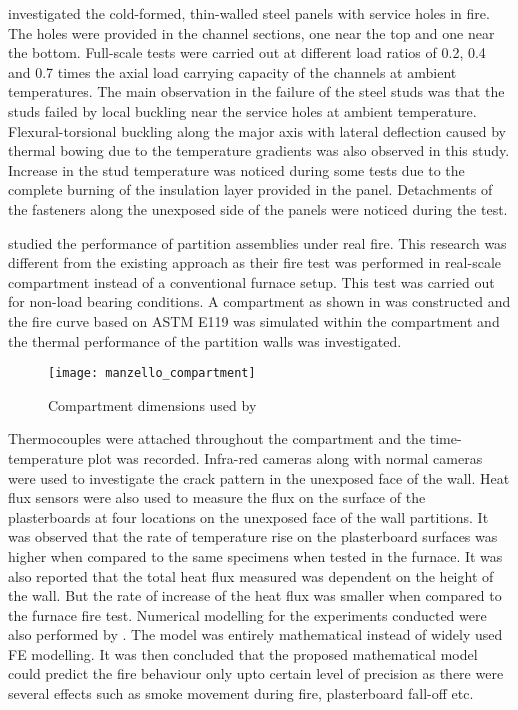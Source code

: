 \citet{Feng2005} investigated the cold-formed, thin-walled steel panels with service holes in fire. The holes were provided in the channel sections, one near the top and one near the bottom. Full-scale tests were carried out at different load ratios of 0.2, 0.4 and 0.7 times the axial load carrying capacity of the channels at ambient temperatures. The main observation in the failure of the steel studs was that the studs failed by local buckling near the service holes at ambient temperature. Flexural-torsional buckling along the major axis with lateral deflection caused by thermal bowing due to the temperature gradients was also observed in this study. Increase in the stud temperature was noticed during some tests due to the complete burning of the insulation layer provided in the panel. Detachments of the fasteners along the unexposed side of the panels were noticed during the test. 

\citet{Manzello2005} studied the performance of partition assemblies under real fire. This research was different from the existing approach as their fire test was performed in real-scale compartment instead of a conventional furnace setup. This test was carried out for non-load bearing conditions. A compartment as shown in  was constructed and the fire curve based on ASTM E119 was simulated within the compartment and the thermal performance of the partition walls was investigated.

\begin{figure}[htbp]
	\centering
		\texttt{[image: manzello\_compartment]}		
		\caption{Compartment dimensions used by \citet{Manzello2005}}
			\label{fig:manzello_compartment}

	\end{figure}

Thermocouples were attached throughout the compartment and the time-temperature plot was recorded. Infra-red cameras along with normal cameras were used to investigate the crack pattern in the unexposed face of the wall. Heat flux sensors were also used to measure the flux on the surface of the plasterboards at four locations on the unexposed face of the wall partitions. It was observed that the rate of temperature rise on the plasterboard surfaces was higher when compared to the same specimens when tested in the furnace. It was also reported that the total heat flux measured was dependent on the height of the wall. But the rate of increase of the heat flux was smaller when compared to the furnace fire test. Numerical modelling for the experiments conducted were also performed by \citet{Manzello2007}. The model was entirely mathematical instead of widely used FE modelling. It was then concluded that the proposed mathematical model could predict the fire behaviour only upto certain level of precision as there were several effects such as smoke movement during fire, plasterboard fall-off etc. 

